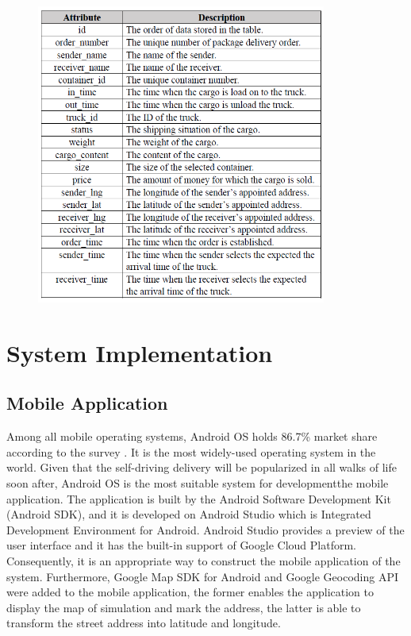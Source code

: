 \documentclass[12pt]{ksthesis}
\begin{document}
\begin{thesis}
{\begin{figure}[H]
\centering
{}
\includegraphics[width=0.85\textwidth]{./figures/Table3-4-OrderTable.PNG}
\vspace{0.5cm}
\label{Fig:OrderTable}
\end{figure}

  



\chapter{System Implementation}\label{Chap:System_Implementation}

\section{Mobile Application}


Among all mobile operating systems, Android OS holds 86.7\% market share according to the survey \cite{SmartphoneOS}. It is the most widely-used operating system in the world. Given that the self-driving delivery will be popularized in all walks of life soon after, Android OS is the most suitable system for developmentthe mobile application. The application is built by the Android Software Development Kit (Android SDK), and it is developed on Android Studio which is Integrated Development Environment for Android. Android Studio provides a preview of the user interface and it has the built-in support of Google Cloud Platform. Consequently, it is an appropriate way to construct the mobile application of the system. Furthermore, Google Map SDK for Android and Google Geocoding API were added to the mobile application, the former enables the application to display the map of simulation and mark the address, the latter is able to transform the street address into latitude and longitude.

}
\end{thesis}
\end{document}
